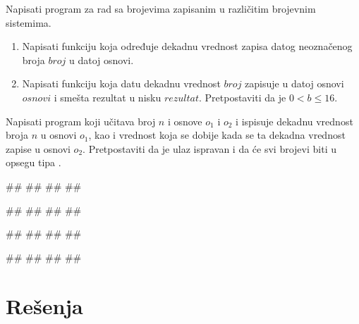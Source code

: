 \begin{Exercise}[difficulty=1, label=NIS_31] 
Napisati program za rad sa brojevima zapisanim u različitim brojevnim sistemima.
\begin{enumerate}
\item Napisati funkciju  koja
određuje dekadnu vrednost zapisa datog neoznačenog broja $broj$ u datoj osnovi. 
\item Napisati funkciju  
koja datu dekadnu vrednost $broj$ zapisuje u datoj osnovi $osnovi$ i smešta rezultat u nisku $rezultat$. 
Pretpostaviti da je $0 < b \leq 16$.  
\end{enumerate}

Napisati program koji učitava broj $n$ i osnove $o_1$ i $o_2$ i ispisuje dekadnu vrednost broja $n$ u osnovi $o_1$, kao i
vrednost koja se dobije kada se ta dekadna vrednost zapise u osnovi $o_2$.
Pretpostaviti da je ulaz ispravan i da će svi brojevi biti u opsegu tipa . 

\begin{miditest}
\begin{upotreba}{1}
#\naslovInt#
##
##
##
\end{upotreba}
\end{miditest}
\begin{miditest}
\begin{upotreba}{2}
#\naslovInt#
##
##
##
\end{upotreba}
\end{miditest}

\begin{miditest}
\begin{upotreba}{3}
#\naslovInt#
##
##
##
\end{upotreba}
\end{miditest}
\begin{miditest}
\begin{upotreba}{4}
#\naslovInt#
##
##
##
\end{upotreba}
\end{miditest}
\end{Exercise}
\ifresenja
\begin{Answer}[ref=NIS_31]
\end{Answer}
\fi

\ifresenja
\section{Rešenja}
\shipoutAnswer
\fi

